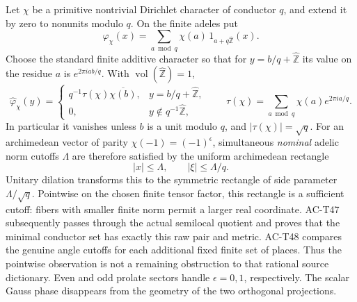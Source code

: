 \begin{proposition}
\label{AC-T11}
Let \(\chi\) be a primitive nontrivial Dirichlet
character of conductor \(q\), and extend it
by zero to nonunits modulo \(q\). On the finite
adeles put
\[
 \varphi_\chi(x)=
   \sum_{a\bmod q}\chi(a)\,
                     1_{a+q\widehat{\mathbb Z}}(x).
                                                               \tag{T.21}
\]
Choose the standard finite additive character
so that for \(y=b/q+\widehat{\mathbb Z}\) its
value on the residue \(a\) is \(e^{2\pi iab/q}\).
With \(\operatorname{vol}(\widehat{\mathbb Z})=1\),
\[
 \widehat\varphi_\chi(y)=
 \begin{cases}
 q^{-1}\tau(\chi)\overline{\chi(b)},&
           y=b/q+\widehat{\mathbb Z},\\
 0,&y\notin q^{-1}\widehat{\mathbb Z},
 \end{cases}
 \qquad
 \tau(\chi)=\sum_{a\bmod q}\chi(a)e^{2\pi ia/q}.                 \tag{T.22}
\]
In particular it vanishes unless \(b\) is a unit
modulo \(q\), and \(|\tau(\chi)|=\sqrt q\).
For an archimedean vector of parity
\(\chi(-1)=(-1)^\epsilon\), simultaneous
\emph{nominal} adelic norm cutoffs \(\Lambda\)
are therefore satisfied by the uniform archimedean rectangle
\[
 |x|\leq\Lambda,\qquad
 |\xi|\leq\Lambda/q.                                         \tag{T.23}
\]
Unitary dilation transforms this to the symmetric
rectangle of side parameter \(\Lambda/\sqrt q\).
Pointwise on the chosen finite tensor factor, this rectangle
is a sufficient cutoff: fibers with smaller finite norm permit
a larger real coordinate.  AC-T47 subsequently passes through
the actual semilocal quotient and proves that the minimal
conductor set has exactly this raw pair and metric.
AC-T48 compares the genuine angle cutoffs for each additional
fixed finite set of places.  Thus the pointwise observation
is not a remaining obstruction to that rational source
dictionary.
Even and odd prolate sectors handle
\(\epsilon=0,1\), respectively. The scalar
Gauss phase disappears from the geometry of the
two orthogonal projections.
\end{proposition}

